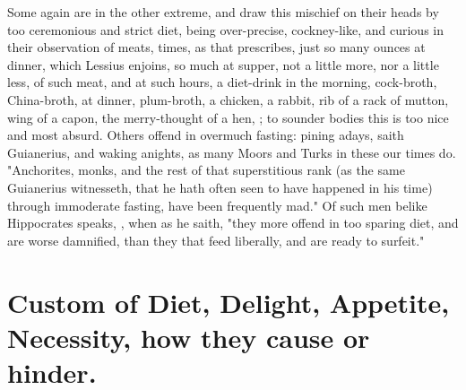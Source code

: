 Some again are in the other extreme, and draw this mischief on their heads by
too ceremonious and strict diet, being over-precise, cockney-like, and curious
in their observation of meats, times, as that  prescribes,
just so many ounces at dinner, which Lessius enjoins, so much at supper, not a
little more, nor a little less, of such meat, and at such hours, a diet-drink
in the morning, cock-broth, China-broth, at dinner, plum-broth, a chicken, a
rabbit, rib of a rack of mutton, wing of a capon, the merry-thought of a hen,
\etc{}; to sounder bodies this is too nice and most absurd. Others offend in
overmuch fasting: pining adays, saith Guianerius, and
waking anights, as many Moors and Turks in these our times do. "Anchorites,
monks, and the rest of that superstitious rank (as the same Guianerius
witnesseth, that he hath often seen to have happened in his time) through
immoderate fasting, have been frequently mad." Of such men belike Hippocrates
speaks, , when as he saith,
"they more offend in too sparing diet, and are worse
damnified, than they that feed liberally, and are ready to surfeit."

\section{Custom of Diet, Delight, Appetite, Necessity, how they cause or hinder.}

